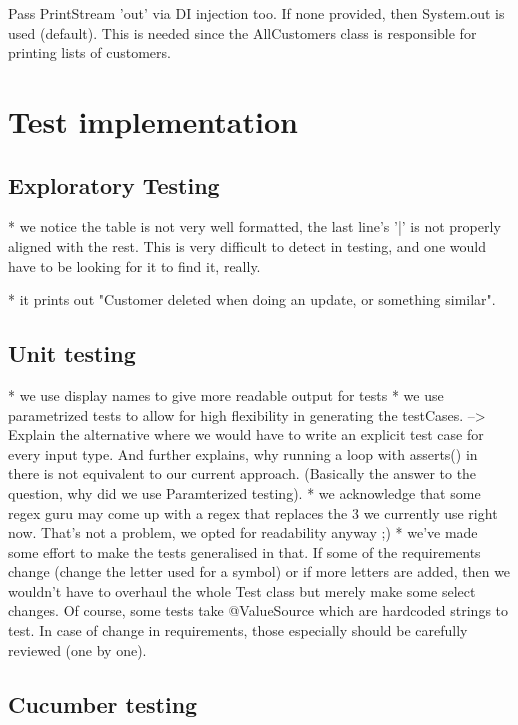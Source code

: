 \documentclass[11pt]{article}
\begin{document}

Pass PrintStream 'out' via DI injection too. If none provided, then System.out is used (default). This is needed since the AllCustomers class is responsible for printing lists of customers.  


\section{Test implementation}

\subsection{Exploratory Testing}

* we notice the table is not very well formatted, the last line's '|' is not properly aligned with the rest. This is very difficult to detect in testing, and one would have to be looking for it to find it, really. 

* it prints out "Customer deleted when doing an update, or something similar". 


\subsection{Unit testing}

* we use display names to give more readable output for tests
* we use parametrized tests to allow for high flexibility in generating the testCases. --> Explain the alternative where we would have to write an explicit test case for every input type. And further explains, why running a loop with asserts() in there is not equivalent to our current approach. (Basically the answer to the question, why did we use Paramterized testing). 
* we acknowledge that some regex guru may come up with a regex that replaces the 3 we currently use right now. That's not a problem, we opted for readability anyway ;) 
* we've made some effort to make the tests generalised in that. If some of the requirements change (change the letter used for a symbol) or if more letters are added, then we wouldn't have to overhaul the whole Test class but merely make some select changes. Of course, some tests take @ValueSource which are hardcoded strings to test. In case of change in requirements, those especially should be carefully reviewed (one by one). 


\subsection{Cucumber testing}
\end{document}
